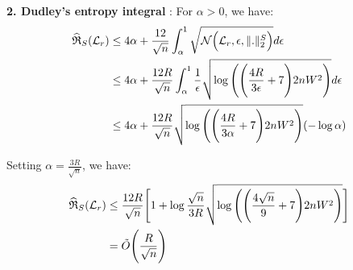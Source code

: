 \noindent\newline\newline\textbf{2. Dudley's entropy integral} : For $\alpha>0$, we have:
\begin{align*}
    \widehat{\mathfrak{R}}_S(\mathcal{L}_r) &\le 4\alpha + \frac{12}{\sqrt n} \int_\alpha^1 \sqrt{\mathcal{N}\Big( \mathcal{L}_r, \epsilon, \|.\|_2^S \Big)}d\epsilon \\ 
        &\le 4\alpha + \frac{12R}{\sqrt{n}} \int_\alpha^1 \frac{1}{\epsilon}\sqrt{
            \log\Bigg( 
                \Bigg( 
                    \frac{4R}{3\epsilon} + 7
                 \Bigg)2nW^2
             \Bigg)
        }d\epsilon \\
        &\le 4\alpha + \frac{12R}{\sqrt n} \sqrt{
            \log\Bigg( 
                \Bigg( 
                    \frac{4R}{3\alpha} + 7 
                 \Bigg)2nW^2
             \Bigg)
        }(-\log\alpha)
\end{align*} 

\noindent Setting $\alpha=\frac{3R}{\sqrt n}$, we have:
\begin{align*}
    \widehat{\mathfrak{R}}_S(\mathcal{L}_r) 
        &\le \frac{12R}{\sqrt n} \Bigg[ 
            1 + \log\frac{\sqrt n}{3R}\sqrt{
                \log\Bigg( 
                    \Bigg( 
                        \frac{4\sqrt n}{9} + 7
                     \Bigg)2nW^2
                 \Bigg)
            }
         \Bigg] \\
        &= \tilde O\Bigg( \frac{R}{\sqrt{n}} \Bigg)
\end{align*}


